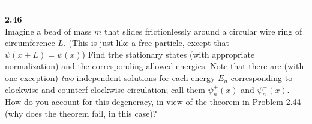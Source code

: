 \documentclass[fleqn]{article}
\begin{document}
  \rule{15cm}{1pt}

  \textbf{2.46}
  \\
  Imagine a bead of mass $m$ that slides frictionlessly around a circular wire ring of circumference $L$. 
  (This is just like a free particle, except that $\psi(x+L)=\psi(x)$) Find trhe stationary states (with
  appropriate normalization) and the corresponding allowed energies. Note that there are (with one exception)
  \emph{two} independent solutions for each energy $E_n$ corresponding to clockwise and counterf-clockwise
  circulation; call them $\psi^+_n(x)$ and $\psi^-_n(x)$. How do you account for this degeneracy, in
  view of the theorem in Problem 2.44 (why does the theorem fail, in this case)?
\end{document}
